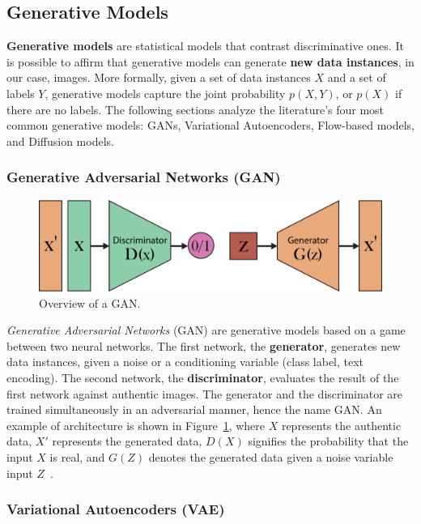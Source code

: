 \documentclass[preprint]{elsarticle}
\begin{document}
\subsection{Generative Models}\label{sec:imggenmodels}
\textbf{Generative models} are statistical models that contrast discriminative ones. 
It is possible to affirm that generative models can generate \textbf{new data instances}, 
in our case, images. 
More formally, given a set of data instances $X$ and a set of labels $Y$, 
generative models capture the joint probability $p(X, Y)$, or $p(X)$ if there are no labels. 
The following sections  analyze the literature's four most common generative models: GANs, Variational Autoencoders, Flow-based models, and Diffusion models.


\subsubsection{Generative Adversarial Networks (GAN)}\label{sec:gan}

\begin{figure}[b]
	\centering
    \includegraphics[scale=0.8]{img/svg/GAN.png}
	\caption{Overview of a GAN.}\label{fig:gan}
\end{figure}

\emph{Generative Adversarial Networks} (GAN) \cite{goodfellow2014generative} are generative models based on a game between two neural networks. 
The first network, the \textbf{generator}, generates new data instances, given a noise or a conditioning variable (class label, text encoding). 
The second network, the \textbf{discriminator}, evaluates the result of the first network against authentic images.
The generator and the discriminator are trained simultaneously in an adversarial manner, hence the name GAN. An example of architecture is shown in Figure~\ref{fig:gan}, where $X$ represents the authentic data, $X'$ represents the generated data, $D(X)$ signifies the probability that the input $X$ is real, and $G(Z)$ denotes the generated data given a noise variable input $Z$~\cite{weng2019gan}.

\subsubsection{Variational Autoencoders (VAE)}\label{sec:vae}
\end{document}
